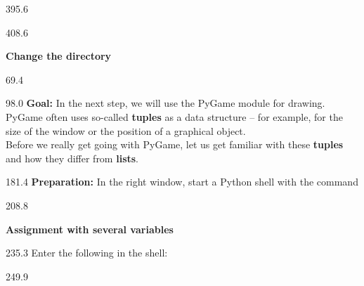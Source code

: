 \documentclass{aslab}
\newcommand*\inp[1]{\makebox[26.4bp][l]{\ttfamily(#1)}}
\begin{document}
\begin{region}{395.6}
\end{region}

\begin{region}[pitch=12.3]{408.6}
\begin{letters}
\item \textbf{Change the directory}\\
\end{letters}
\end{region}

\nextpage
\begin{region}{69.4}
\end{region}

\begin{region}[pitch=14]{98.0}
\textbf{Goal:} In the next step, we will use the PyGame module for drawing.
PyGame often uses so-called \textbf{tuples} as a data structure -- for
example, for the size of the window or the position of a graphical
object.\\
Before we really get going with PyGame, let us get familiar with these
\textbf{tuples} and how they differ from \textbf{lists}.
\end{region}

\begin{region}{181.4}
\textbf{Preparation:} In the right window, start a Python shell with the
command 
\end{region}

\begin{region}{208.8}
\begin{tasks}
\item \textbf{Assignment with several variables}
\end{tasks}
\end{region}

\begin{region}[x=74.7,right=0]{235.3}
Enter the following in the shell:
\end{region}

\begin{region}[x=74.7,right=0,pitch=15.4]{249.9}
\inp{1}\\
\inp{2}\\
\inp{3}
\end{region}
\end{document}
